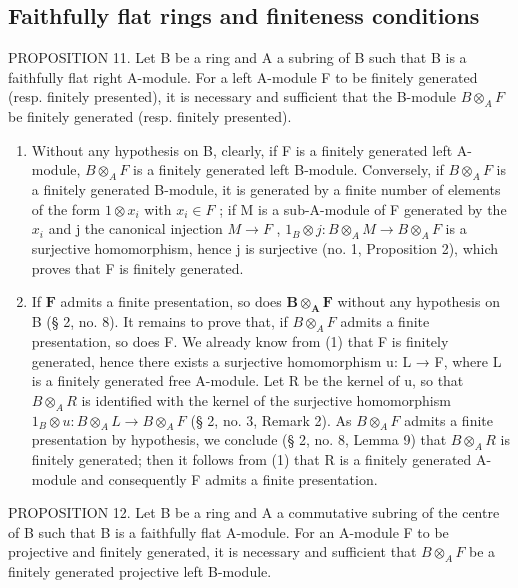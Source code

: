 \subsection{Faithfully flat rings and finiteness conditions}

PROPOSITION 11. Let B be a ring and A a subring of B such that B is a faithfully flat right A-module. For a left A-module F to be finitely generated (resp. finitely presented), it is necessary and sufficient that the B-module \(B \otimes_{A} F\) be finitely generated (resp. finitely presented).

\begin{enumerate}
\def\labelenumi{(\arabic{enumi})}
\item
  Without any hypothesis on B, clearly, if F is a finitely generated left A-module, \(B \otimes_{A} F\) is a finitely generated left B-module. Conversely, if \(B \otimes_{A} F\) is a finitely generated B-module, it is generated by a finite number of elements of the form \(1 \otimes x_{i}\) with \(x_{i} \in F\) ; if M is a sub-A-module of F generated by the \(x_{i}\) and j the canonical injection \(M \to F\) , \(1_{B} \otimes j: B \otimes_{A} M \to B \otimes_{A} F\) is a surjective homomorphism, hence j is surjective (no. 1, Proposition 2), which proves that F is finitely generated.
\item
  If \(\mathbf{F}\) admits a finite presentation, so does \(\mathbf{B} \otimes_{\mathbf{A}} \mathbf{F}\) without any hypothesis on B (§ 2, no. 8). It remains to prove that, if \(B \otimes_{A} F\) admits a finite presentation, so does F. We already know from (1) that F is finitely generated, hence there exists a surjective homomorphism u: L → F, where L is a finitely generated free A-module. Let R be the kernel of u, so that \(B \otimes_{A} R\) is identified with the kernel of the surjective homomorphism \(1_{B} \otimes u: B \otimes_{A} L \to B \otimes_{A} F\) (§ 2, no. 3, Remark 2). As \(B \otimes_{A} F\) admits a finite presentation by hypothesis, we conclude (§ 2, no. 8, Lemma 9) that \(B \otimes_{A} R\) is finitely generated; then it follows from (1) that R is a finitely generated A-module and consequently F admits a finite presentation.
\end{enumerate}

PROPOSITION 12. Let B be a ring and A a commutative subring of the centre of B such that B is a faithfully flat A-module. For an A-module F to be projective and finitely generated, it is necessary and sufficient that \(B \otimes_{A} F\) be a finitely generated projective left B-module.

